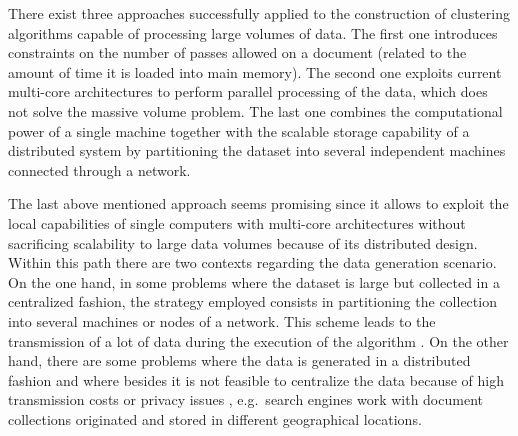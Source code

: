 \documentclass[10pt]{article}
\begin{document}
There exist three approaches successfully applied to the construction of clustering algorithms capable of processing large volumes of data. The first one introduces constraints on the number of passes allowed on a document (related to the amount of time it is loaded into main memory). The second one exploits current multi-core architectures to perform parallel processing of the data, which does not solve the massive volume problem. The last one combines the computational power of a single machine together with the scalable storage capability of a distributed system by partitioning the dataset into several independent machines connected through a network.

The last above mentioned approach seems promising since it allows to exploit the local capabilities of single computers with multi-core architectures without sacrificing scalability to large data volumes because of its distributed design. Within this path there are two contexts regarding the data generation scenario. On the one hand, in some problems where the dataset is large but collected in a centralized fashion, the strategy employed consists in partitioning the collection into several
machines or nodes of a network. This scheme leads to the transmission of a lot of data during the execution of the algorithm \cite{N15}. On the other hand, there are some problems where the data is generated in a distributed fashion and where besides it is not feasible to centralize the data because of high transmission costs or privacy issues \cite{JW05,LHLX12}, e.g.\  search engines  work with document collections originated and stored in different geographical locations.
\end{document}
